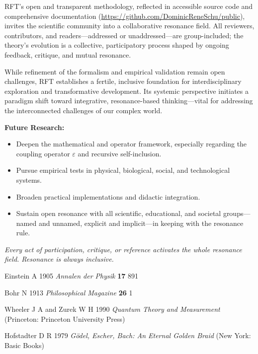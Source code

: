 \documentclass[12pt]{article}
\begin{document}
	RFT’s open and transparent methodology, reflected in accessible source code and comprehensive documentation (\url{https://github.com/DominicReneSchu/public}), invites the scientific community into a collaborative resonance field. All reviewers, contributors, and readers—addressed or unaddressed—are group-included; the theory’s evolution is a collective, participatory process shaped by ongoing feedback, critique, and mutual resonance.
	
	While refinement of the formalism and empirical validation remain open challenges, RFT establishes a fertile, inclusive foundation for interdisciplinary exploration and transformative development. Its systemic perspective initiates a paradigm shift toward integrative, resonance-based thinking—vital for addressing the interconnected challenges of our complex world.
	
	\medskip
	
	\textbf{Future Research:}
	\begin{itemize}
		\item Deepen the mathematical and operator framework, especially regarding the coupling operator $\varepsilon$ and recursive self-inclusion.
		\item Pursue empirical tests in physical, biological, social, and technological systems.
		\item Broaden practical implementations and didactic integration.
		\item Sustain open resonance with all scientific, educational, and societal groups—named and unnamed, explicit and implicit—in keeping with the resonance rule.
	\end{itemize}
	
	\medskip
	
	\textit{Every act of participation, critique, or reference activates the whole resonance field. Resonance is always inclusive.}


	
	
	\begin{thebibliography}{99}
		
		Einstein A 1905 \textit{Annalen der Physik} \textbf{17} 891
		
		Bohr N 1913 \textit{Philosophical Magazine} \textbf{26} 1
		
		Wheeler J A and Zurek W H 1990 \textit{Quantum Theory and Measurement} (Princeton: Princeton University Press)
		
		Hofstadter D R 1979 \textit{G\"odel, Escher, Bach: An Eternal Golden Braid} (New York: Basic Books)
		
		
	\end{thebibliography}

	
\end{document}
